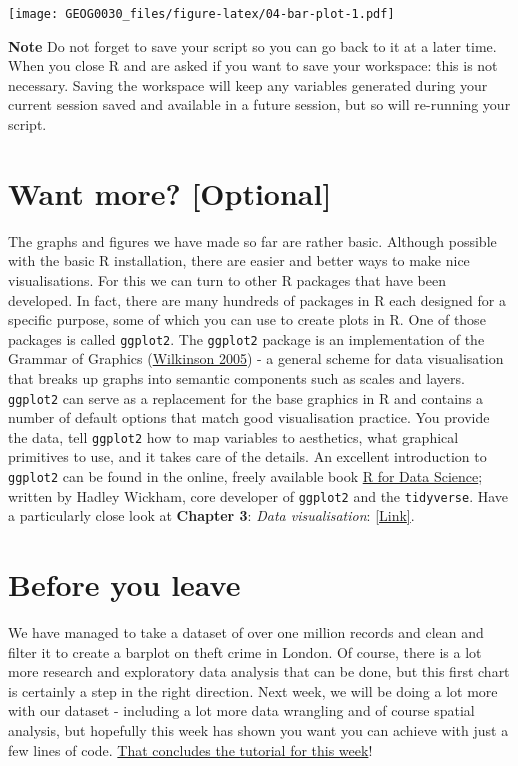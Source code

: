 \documentclass[
]{book}
\begin{document}
\texttt{[image: GEOG0030\_files/figure-latex/04-bar-plot-1.pdf]}

\textbf{Note}
Do not forget to save your script so you can go back to it at a later time. When you close R and are asked if you want to save your workspace: this is not necessary. Saving the workspace will keep any variables generated during your current session saved and available in a future session, but so will re-running your script.

\hypertarget{want-more-optional}{%
\section{Want more? {[}Optional{]}}\label{want-more-optional}}

The graphs and figures we have made so far are rather basic. Although possible with the basic R installation, there are easier and better ways to make nice visualisations. For this we can turn to other R packages that have been developed. In fact, there are many hundreds of packages in R each designed for a specific purpose, some of which you can use to create plots in R. One of those packages is called \texttt{ggplot2}. The \texttt{ggplot2} package is an implementation of the Grammar of Graphics (\href{https://en.wikipedia.org/wiki/Leland_Wilkinson}{Wilkinson 2005}) - a general scheme for data visualisation that breaks up graphs into semantic components such as scales and layers. \texttt{ggplot2} can serve as a replacement for the base graphics in R and contains a number of default options that match good visualisation practice. You provide the data, tell \texttt{ggplot2} how to map variables to aesthetics, what graphical primitives to use, and it takes care of the details. An excellent introduction to \texttt{ggplot2} can be found in the online, freely available book \href{https://r4ds.had.co.nz/data-visualisation.html}{R for Data Science}; written by Hadley Wickham, core developer of \texttt{ggplot2} and the \texttt{tidyverse}. Have a particularly close look at \textbf{Chapter 3}: \emph{Data visualisation}: \href{https://r4ds.had.co.nz/data-visualisation.html}{{[}Link{]}}.

\hypertarget{byl-w04}{%
\section{Before you leave}\label{byl-w04}}

We have managed to take a dataset of over one million records and clean and filter it to create a barplot on theft crime in London. Of course, there is a lot more research and exploratory data analysis that can be done, but this first chart is certainly a step in the right direction. Next week, we will be doing a lot more with our dataset - including a lot more data wrangling and of course spatial analysis, but hopefully this week has shown you want you can achieve with just a few lines of code. \href{https://www.youtube.com/watch?v=NKyYr2pbXUM}{That concludes the tutorial for this week}!
\end{document}
